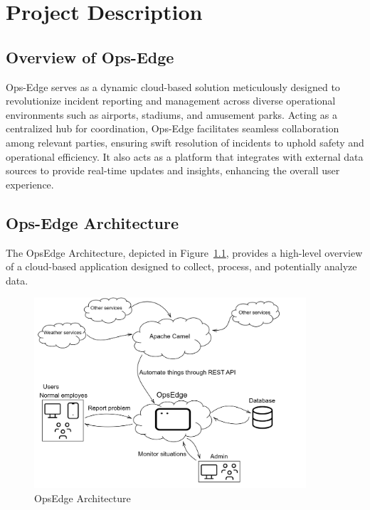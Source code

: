 \chapter{Project Description}
\label{ch:project_description}

\section{Overview of Ops-Edge}
\label{sec:project_description:overview}
Ops-Edge serves as a dynamic cloud-based solution meticulously designed to revolutionize incident reporting and management across diverse operational environments such as airports, stadiums, and amusement parks. Acting as a centralized hub for coordination, Ops-Edge facilitates seamless collaboration among relevant parties, ensuring swift resolution of incidents to uphold safety and operational efficiency. It also acts as a platform that integrates with external data sources to provide real-time updates and insights, enhancing the overall user experience.

\section{Ops-Edge Architecture}
\label{sec:project_description:opsedge_architecture}

The OpsEdge Architecture, depicted in Figure~\ref{fig:opsedge_architecture}, provides a high-level overview of a cloud-based application designed to collect, process, and potentially analyze data.

\begin{figure}[h]
    \centering
    \includegraphics[width=0.9\textwidth]{gfx/opsedge-architecture.png}
    \caption{OpsEdge Architecture}
    \label{fig:opsedge_architecture}
\end{figure}

